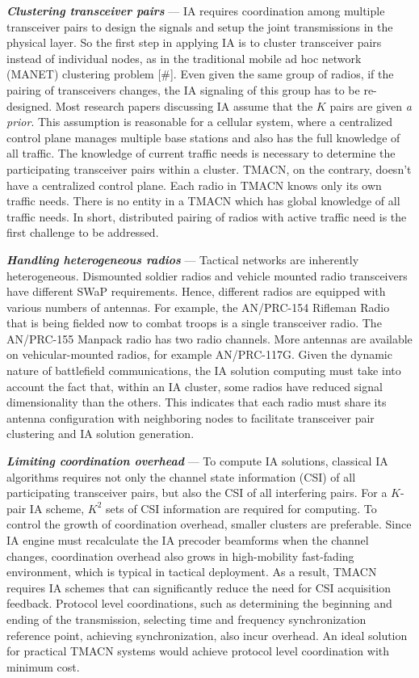 \documentclass[letterpaper,11pt,onecolumn]{article}
\begin{document}
{\textbf{\textit{Clustering transceiver pairs}}} --- IA requires coordination among multiple transceiver pairs to design the signals and setup the joint transmissions in the physical layer. So the first step in applying IA is to cluster transceiver pairs instead of individual nodes, as in the traditional mobile ad hoc network (MANET) clustering problem  [\#]. Even given the same group of radios, if the pairing of transceivers changes, the IA signaling of this group has to be re-designed. Most research papers discussing IA assume that the $K$ pairs are given {\it{a prior}}. This assumption is reasonable for a cellular system, where a centralized control plane manages multiple base stations and also has the full knowledge of all traffic. The knowledge of current traffic needs is necessary to determine the participating transceiver pairs within a cluster. TMACN, on the contrary, doesn't have a centralized control plane. Each radio in TMACN knows only its own traffic needs. There is no entity in a TMACN which has global knowledge of all traffic needs. In short, distributed pairing of radios with active traffic need is the first challenge to be addressed.

{\textbf{\textit{Handling heterogeneous radios}}} ---  Tactical networks are inherently heterogeneous. Dismounted soldier radios and vehicle mounted radio transceivers have different SWaP requirements. Hence, different radios are equipped with various numbers of antennas. For example, the AN/PRC-154 Rifleman Radio that is being fielded now to combat troops is a single transceiver radio. The AN/PRC-155 Manpack radio has two radio channels. More antennas are available on vehicular-mounted radios, for example AN/PRC-117G. Given the dynamic nature of battlefield communications, the IA solution computing must take into account the fact that, within an IA cluster, some radios have reduced signal dimensionality than the others. This indicates that each radio must share its antenna configuration with neighboring nodes to facilitate transceiver pair clustering and IA solution generation. 

{\textbf{\textit{Limiting coordination overhead}}} --- To compute IA solutions, classical IA algorithms requires not only the channel state information (CSI) of all participating transceiver pairs, but also the CSI of all interfering pairs. For a $K$-pair IA scheme, $K^2$ sets of CSI information are required for computing. To control the growth of coordination overhead, smaller clusters are preferable. Since IA engine must recalculate the IA precoder beamforms when the channel changes, coordination overhead also grows in high-mobility fast-fading environment, which is typical in tactical deployment. As a result, TMACN requires IA schemes that can significantly reduce the need for CSI acquisition feedback. Protocol level coordinations, such as determining the beginning and ending of the transmission, selecting time and frequency synchronization reference point, achieving synchronization, also incur overhead. An ideal solution for practical TMACN systems would achieve protocol level coordination with minimum cost.
\end{document}
